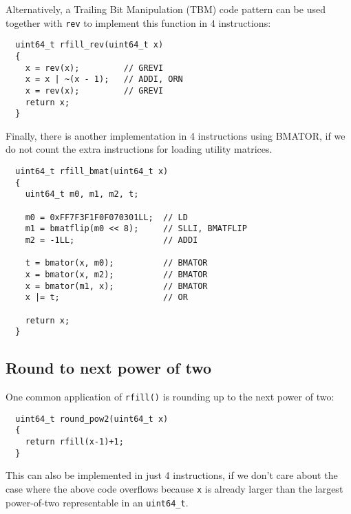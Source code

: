 Alternatively, a Trailing Bit Manipulation (TBM) code pattern can be used
together with {\tt rev} to implement this function in 4 instructions:

\begin{minipage}{\linewidth}
\begin{verbatim}
  uint64_t rfill_rev(uint64_t x)
  {
    x = rev(x);         // GREVI
    x = x | ~(x - 1);   // ADDI, ORN
    x = rev(x);         // GREVI
    return x;
  }
\end{verbatim}
\end{minipage}

Finally, there is another implementation in 4 instructions using BMATOR, if we do
not count the extra instructions for loading utility matrices.

\begin{minipage}{\linewidth}
\begin{verbatim}
  uint64_t rfill_bmat(uint64_t x)
  {
    uint64_t m0, m1, m2, t;

    m0 = 0xFF7F3F1F0F070301LL;  // LD
    m1 = bmatflip(m0 << 8);     // SLLI, BMATFLIP
    m2 = -1LL;                  // ADDI

    t = bmator(x, m0);          // BMATOR
    x = bmator(x, m2);          // BMATOR
    x = bmator(m1, x);          // BMATOR
    x |= t;                     // OR

    return x;
  }
\end{verbatim}
\end{minipage}


\subsection{Round to next power of two}

One common application of {\tt rfill()} is rounding up to the next power of two:

\begin{minipage}{\linewidth}
\begin{verbatim}
  uint64_t round_pow2(uint64_t x)
  {
    return rfill(x-1)+1;
  }
\end{verbatim}
\end{minipage}

This can also be implemented in just 4 instructions, if we don't care about the
case where the above code overflows because {\tt x} is already larger than the
largest power-of-two representable in an {\tt uint64\_t}.


